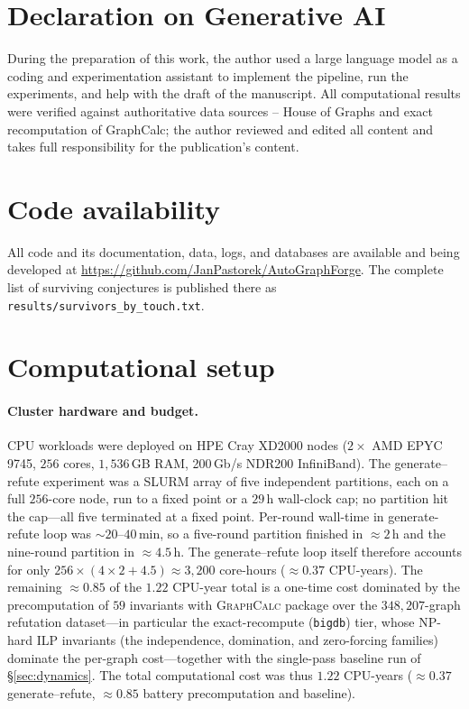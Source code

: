\documentclass[]{ceurart}
\begin{document}
\section*{Declaration on Generative AI}
During the preparation of this work, the author used a large language model
as a coding and experimentation assistant to implement the pipeline, run the
experiments, and help with the draft of the manuscript. All computational results were verified against authoritative data sources -- House of Graphs and exact recomputation of GraphCalc; the
author reviewed and edited all content and takes full responsibility for the
publication's content.

\section*{Code availability}
All code and its documentation, data, logs, and databases are available and being developed at \url{https://github.com/JanPastorek/AutoGraphForge}.
The complete list of surviving conjectures is published there as
\texttt{results/survivors\_by\_touch.txt}.



\appendix

\section{Computational setup}
\label{app:compute}
\label{app:partitions}

\paragraph{Cluster hardware and budget.}
CPU workloads were deployed on HPE Cray XD2000 nodes ($2\times$ AMD EPYC 9745, $256$ cores,
$1{,}536$\,GB RAM, 200\,Gb/s NDR200 InfiniBand). The generate--refute experiment was a SLURM array of five independent
partitions, each on a full $256$-core node, run to a fixed point or a $29$\,h wall-clock cap; no partition
hit the cap---all five terminated at a fixed point. Per-round wall-time in generate-refute loop was
$\sim\!20$--$40$\,min, so a five-round partition finished in $\approx\!2$\,h and the
nine-round partition in $\approx\!4.5$\,h. The generate--refute loop itself therefore
accounts for only $256\times(4\times2+4.5)\approx3{,}200$ core-hours ($\approx\!0.37$
CPU-years). The remaining $\approx\!0.85$ of the $1.22$ CPU-year total is a one-time
cost dominated by the precomputation of  $59$ invariants with \textsc{GraphCalc} package
 over the $348{,}207$-graph refutation dataset---in particular the
exact-recompute (\texttt{bigdb}) tier, whose NP-hard ILP invariants (the
independence, domination, and zero-forcing families) dominate the per-graph
cost---together with the single-pass baseline run of \S\ref{sec:dynamics}. The
total computational cost was thus $1.22$ CPU-years ($\approx\!0.37$ generate--refute,
$\approx\!0.85$ battery precomputation and baseline).
\end{document}
